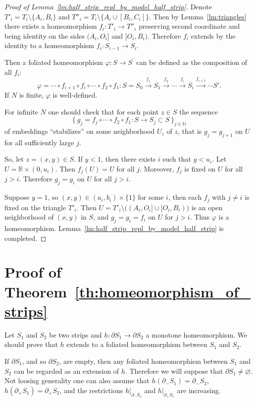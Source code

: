 \documentclass[12pt, reqno]{amsart}
\newcommand{\bR}{\mathbb{R}}
\newcommand{\bN}{\mathbb{N}}
\newcommand\Usp{U}
\newcommand\dif{h}
\newcommand{\strip}{S}
\begin{document}
\begin{proof}[Proof of Lemma~\ref{lm:half_strip_repl_by_model_half_strip}]
Denote $T'_i = T_i \setminus \{A_i, B_i\}$ and $T''_i = T_i \setminus \{A_i \cup [B_i, C_i]\}$.
Then by Lemma~\ref{lm:triangles} there exists a homeomorphism $f_i: T'_i \rightarrow T''_i$ preserving second coordinate and being identity on the sides $(A_i,O_i]$ and $[O_i,B_i)$.
Therefore $f_i$ extends by the identity to a homeomorphism $f_i: \strip_{i-1} \to \strip_{i}$.

Then a foliated homeomorphism $\varphi: \strip \rightarrow \strip^{'}$ can be defined as the composition of all $f_i$:
\[
\varphi = \cdots\circ f_{i+1} \circ f_{i} \circ\cdots \circ f_2 \circ f_{1}: 
\strip=\strip_0 \xrightarrow{f_1} \strip_1 \xrightarrow{f_2} %
\cdots  \xrightarrow{f_{i}} \strip_i \xrightarrow{f_{i+1}} \cdots \strip'.
\]
If $N$ is finite, $\varphi$ is well-defined.

For infinite $N$ one should check that for each point $z\in\strip$ the sequence 
\[ \bigl\{ \ g_j = f_j \circ \cdots \circ f_2 \circ f_{1}: \strip \to \strip_j \subset \strip \ \bigr\}_{j\in\bN}\] of embeddings ``stabilizes'' on some neighborhood $\Usp_z$ of $z$, that is $g_j = g_{j+1}$ on $\Usp$ for all sufficiently large $j$.

So, let $z=(x,y)\in\strip$.
If $y<1$, then there exists $i$ such that $y<u_i$.
Let $\Usp=\bR \times (0,u_i)$.
Then $f_j(\Usp) = \Usp$ for all $j$.
Moreover, $f_j$ is fixed on $\Usp$ for all $j>i$.
Therefore $g_j = g_i$ on $\Usp$ for all $j>i$.

Suppose $y=1$, so $(x,y) \in (a_i,b_i)\times \{1\}$ for some $i$, then each $f_j$ with $j\not=i$ is fixed on the triangle $T'_i$.
Then $\Usp = T'_i \setminus \bigl( (A_i,O_i] \cup [O_i,B_i) \bigr)$ is an open neighborhood of $(x,y)$ in $\strip$, and $g_j = g_i = f_i$ on $\Usp$ for $j>i$.
Thus $\varphi$ is a homeomorphism.
Lemma~\ref{lm:half_strip_repl_by_model_half_strip} is completed.
\end{proof}




\section{Proof of Theorem~\ref{th:homeomorphism_of_strips}}\label{sect:proof:th:homeomorphism_of_strips}
Let $\strip_1$ and $\strip_2$ be two strips and $\dif: \partial \strip_1 \to \partial \strip_2$ a monotone homeomorphism.
We should prove that $\dif$ extends to a foliated homeomorphism between $\strip_1$ and $\strip_2$.

If $\partial\strip_1$, and so $\partial \strip_2$, are empty, then any foliated homeomorphism between $\strip_1$ and $\strip_2$ can be regarded as an extension of $\dif$.
Therefore we will suppose that $\partial\strip_1\not=\varnothing$.
Not loosing generality one can also assume that $\dif(\partial_{-}\strip_1)=\partial_{-}\strip_2$, $\dif(\partial_{+}\strip_1)=\partial_{+}\strip_2$, and the restrictions $\dif|_{\partial_{-}\strip_1}$ and $\dif|_{\partial_{+}\strip_1}$ are increasing.
\end{document}
